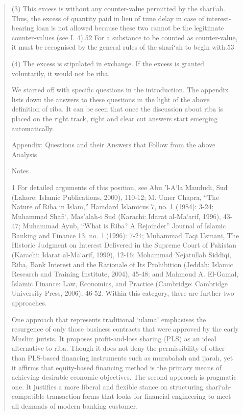 \begin{quote}
(3) This excess is without any counter-value permitted by the shari‘ah. Thus, the excess of quantity paid in lieu of time delay in case of interest-bearing loan is not allowed because these two cannot be the legitimate counter-values (see I. 4).52 For a substance to be counted as counter-value, it must be recognised by the general rules of the shari‘ah to begin with.53

(4) The excess is stipulated in exchange. If the excess is granted voluntarily, it would not be riba.

We started off with specific questions in the introduction. The appendix lists down the answers to these questions in the light of the above definition of riba. It can be seen that once the discussion about riba is placed on the right track, right and clear cut answers start emerging automatically.

Appendix: Questions and their Answers that Follow from the above Analysis

Notes

1 For detailed arguments of this position, see Abu 'l-A‘la Maududi, Sud (Lahore: Islamic Publications, 2000), 110-12; M. Umer Chapra, “The Nature of Riba in Islam,” Hamdard Islamicus 7, no. 1 (1984): 3-24; Muhammad Shafi‘, Mas'alah-i Sud (Karachi: Idarat al-Ma‘arif, 1996), 43-47; Muhammad Ayub, “What is Riba? A Rejoinder” Journal of Islamic Banking and Finance 13, no. 1 (1996): 7-24; Muhammad Taqi Usmani, The Historic Judgment on Interest Delivered in the Supreme Court of Pakistan (Karachi: Idarat al-Ma‘arif, 1999), 12-16; Mohammad Nejatullah Siddiqi, Riba, Bank Interest and the Rationale of Its Prohibition (Jeddah: Islamic Research and Training Institute, 2004), 45-48; and Mahmoud A. El-Gamal, Islamic Finance: Law, Economics, and Practice (Cambridge: Cambridge University Press, 2006), 46-52. Within this category, there are further two approaches.

One approach that represents traditional ‘ulama' emphasises the resurgence of only those business contracts that were approved by the early Muslim jurists. It proposes profit-and-loss sharing (PLS) as an ideal alternative to riba. Though it does not deny the permissibility of other than PLS-based financing instruments such as murabahah and ijarah, yet it affirms that equity-based financing method is the primary means of achieving desirable economic objectives. The second approach is pragmatic one. It justifies a more liberal and flexible stance on structuring shari‘ah-compatible transaction forms that looks for financial engineering to meet all demands of modern banking customer.


\end{quote}
